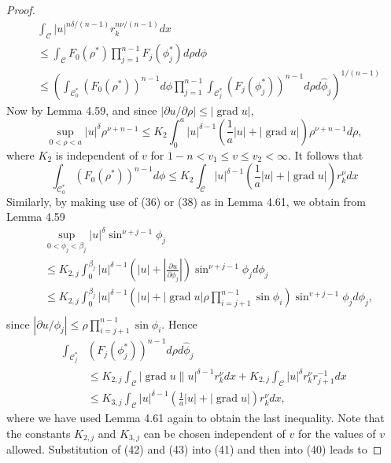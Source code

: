 \begin{proof}
  \[
  \begin{aligned}
  & \int_{\mathcal{C}}|u|^{n \delta /(n-1)} r_k^{n \nu /(n-1)} d x \\
  & \leq \int_{\mathcal{C}} F_0\left(\rho^*\right) \prod_{j=1}^{n-1} F_j\left(\phi_j^*\right) d \rho d \phi \\
  & \leq\left(\int_{\mathcal{C}_0^*}\left(F_0\left(\rho^*\right)\right)^{n-1} d \phi \prod_{j=1}^{n-1} \int_{\mathcal{C}_j^*}\left(F_j\left(\phi_j^*\right)\right)^{n-1} d \rho d \hat{\phi}_j\right)^{1 /(n-1)}
  \end{aligned}
  \]
  Now by Lemma 4.59, and since $|\partial u / \partial \rho| \leq|\operatorname{grad} u|$,
  \[
  \sup _{0<\rho<a}|u|^\delta \rho^{\nu+n-1} \leq K_2 \int_0^a|u|^{\delta-1}\left(\frac{1}{a}|u|+|\operatorname{grad} u|\right) \rho^{\nu+n-1} d \rho,
  \]
  where $K_2$ is independent of $v$ for $1-n<v_1 \leq v \leq v_2<\infty$. It follows that
  \[
  \int_{\mathcal{C}_0^*}\left(F_0\left(\rho^*\right)\right)^{n-1} d \phi \leq K_2 \int_{\mathcal{C}}|u|^{\delta-1}\left(\frac{1}{a}|u|+|\operatorname{grad} u|\right) r_k^\nu d x
  \]
  Similarly, by making use of (36) or (38) as in Lemma 4.61, we obtain from Lemma 4.59
  \[
  \begin{aligned}
  & \sup _{0<\phi_j<\beta_j}|u|^\delta \sin ^{\nu+j-1} \phi_j \\
  & \leq K_{2, j} \int_0^{\beta_j}|u|^{\delta-1}\left(|u|+\left|\frac{\partial u}{\partial \phi_j}\right|\right) \sin ^{\nu+j-1} \phi_j d \phi_j \\
  & \leq K_{2, j} \int_0^{\beta_j}|u|^{\delta-1}\left(|u|+|\operatorname{grad} u| \rho \prod_{i=j+1}^{n-1} \sin \phi_i\right) \sin ^{v+j-1} \phi_j d \phi_j, \\
  &
  \end{aligned}
  \]
  since $\left|\partial u / \phi_j\right| \leq \rho \prod_{i=j+1}^{n-1} \sin \phi_i$. Hence
  \[
  \begin{aligned}
  \int_{\mathcal{C}_j^*} & \left(F_j\left(\phi_j^*\right)\right)^{n-1} d \rho d \hat{\phi}_j \\
  & \leq K_{2, j} \int_{\mathcal{C}}|\operatorname{grad} u \| u|^{\delta-1} r_k^\nu d x+K_{2, j} \int_{\mathcal{C}}|u|^\delta r_k^\nu r_{j+1}^{-1} d x \\
  & \leq K_{3, j} \int_{\mathcal{C}}|u|^{\delta-1}\left(\frac{1}{a}|u|+|\operatorname{grad} u|\right) r_k^\nu d x,
  \end{aligned}
  \]
  where we have used Lemma 4.61 again to obtain the last inequality. Note that the constants $K_{2, j}$ and $K_{3, j}$ can be chosen independent of $v$ for the values of $v$ allowed. Substitution of (42) and (43) into (41) and then into (40) leads to

\end{proof}
